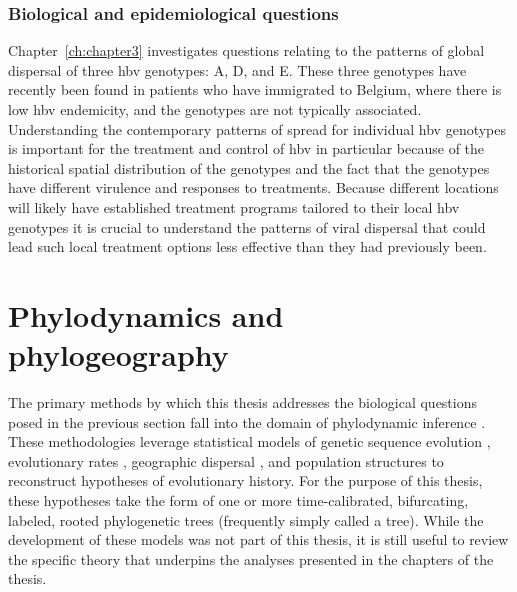\subsubsection{Biological and epidemiological questions}
Chapter~\ref{ch:chapter3} investigates questions relating to the patterns of global dispersal of three \gls{hbv} genotypes: A, D, and E.
These three genotypes have recently been found in patients who have immigrated to Belgium, where there is low \gls{hbv} endemicity, and the genotypes are not typically associated.
Understanding the contemporary patterns of spread for individual \gls{hbv} genotypes is important for the treatment and control of \gls{hbv} in particular because of the historical spatial distribution of the genotypes and the fact that the genotypes have different virulence and responses to treatments.
Because different locations will likely have established treatment programs tailored to their local \gls{hbv} genotypes it is crucial to understand the patterns of viral dispersal that could lead such local treatment options less effective than they had previously been.

\section{Phylodynamics and phylogeography}
The primary methods by which this thesis addresses the biological questions posed in the previous section fall into the domain of phylodynamic inference \citep{volz2013viral}.
These methodologies leverage statistical models of genetic sequence evolution \citep{jukes1969evolution,hasegawa1985dating}, evolutionary rates \citep{baele2012improving,ho2014molecular}, geographic dispersal \citep{lemey2009bayesian,lemey2010phylogeography,dellicour2022accommodating}, and population structures \citep{drummond2005bayesian,minin2008smooth,gill2013improving} to reconstruct hypotheses of evolutionary history.
For the purpose of this thesis, these hypotheses take the form of one or more time-calibrated, bifurcating, labeled, rooted phylogenetic trees (frequently simply called a tree).
While the development of these models was not part of this thesis, it is still useful to review the specific theory that underpins the analyses presented in the chapters of the thesis.

